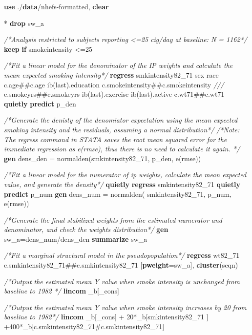 \documentclass[
  10pt,
]{book}
\newenvironment{Shaded}{\begin{snugshade}}{\end{snugshade}}
\newcommand{\CommentTok}[1]{\textcolor[rgb]{0.56,0.35,0.01}{\textit{#1}}}
\newcommand{\DataTypeTok}[1]{\textcolor[rgb]{0.13,0.29,0.53}{#1}}
\newcommand{\FunctionTok}[1]{\textcolor[rgb]{0.00,0.00,0.00}{#1}}
\newcommand{\KeywordTok}[1]{\textcolor[rgb]{0.13,0.29,0.53}{\textbf{#1}}}
\newcommand{\NormalTok}[1]{#1}
\begin{document}
\begin{Shaded}
\begin{Highlighting}[]
\KeywordTok{use}\NormalTok{ ./}\KeywordTok{data}\NormalTok{/nhefs-formatted, }\KeywordTok{clear}

\NormalTok{* }\KeywordTok{drop}\NormalTok{ sw_a}

\CommentTok{/*Analysis restricted to subjects reporting <=25 cig/day at baseline: N = 1162*/}
\KeywordTok{keep} \KeywordTok{if}\NormalTok{ smokeintensity <=25}

\CommentTok{/*Fit a linear model for the denominator of the IP weights and calculate the mean expected smoking intensity*/} 
\KeywordTok{regress}\NormalTok{ smkintensity82_71 sex race c.age##c.age ib(}\FunctionTok{last}\NormalTok{).education c.smokeintensity##c.smokeintensity }\CommentTok{///}
\NormalTok{c.smokeyrs##c.smokeyrs ib(}\FunctionTok{last}\NormalTok{).exercise ib(}\FunctionTok{last}\NormalTok{).active c.wt71##c.wt71}
\KeywordTok{quietly} \KeywordTok{predict}\NormalTok{ p_den}

\CommentTok{/*Generate the denisty of the denomiator expectation using the mean expected smoking intensity and the residuals, assuming a normal distribution*/}
\CommentTok{/*Note: The regress command in STATA saves the root mean squared error for the immediate regression as e(rmse), thus there is no need to calculate it again. */}
\KeywordTok{gen}\NormalTok{ dens_den = }\FunctionTok{normalden}\NormalTok{(smkintensity82_71, p_den, }\FunctionTok{e}\NormalTok{(rmse))}

\CommentTok{/*Fit a linear model for the numerator of ip weights, calculate the mean expected value, and generate the density*/}
\KeywordTok{quietly} \KeywordTok{regress}\NormalTok{ smkintensity82_71}
\KeywordTok{quietly} \KeywordTok{predict}\NormalTok{ p_num}
\KeywordTok{gen}\NormalTok{ dens_num = }\FunctionTok{normalden}\NormalTok{( smkintensity82_71, p_num, }\FunctionTok{e}\NormalTok{(rmse))}

\CommentTok{/*Generate the final stabilized weights from the estimated numerator and denominator, and check the weights distribution*/}
\KeywordTok{gen}\NormalTok{ sw_a=dens_num/dens_den}
\KeywordTok{summarize}\NormalTok{ sw_a}

\CommentTok{/*Fit a marginal structural model in the pseudopopulation*/}
\KeywordTok{regress}\NormalTok{ wt82_71  c.smkintensity82_71##c.smkintensity82_71 [}\KeywordTok{pweight}\NormalTok{=sw_a], }\KeywordTok{cluster}\NormalTok{(seqn)}

\CommentTok{/*Output the estimated mean Y value when smoke intensity is unchanged from baseline to 1982 */}
\KeywordTok{lincom}\NormalTok{ _b[}\DataTypeTok{_cons}\NormalTok{]}

\CommentTok{/*Output the estimated mean Y value when smoke intensity increases by 20 from baseline to 1982*/}
\KeywordTok{lincom}\NormalTok{ _b[}\DataTypeTok{_cons}\NormalTok{] + 20*_b[smkintensity82_71 ] +400*_b[c.smkintensity82_71#c.smkintensity82_71]}
\end{Highlighting}
\end{Shaded}
\end{document}
